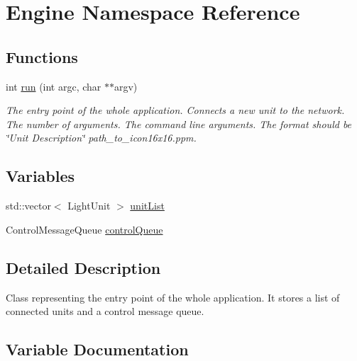 \hypertarget{namespaceEngine}{}\section{Engine Namespace Reference}
\label{namespaceEngine}
\subsection*{Functions}
\begin{DoxyCompactItemize}
\item 
int \hyperlink{namespaceEngine_a18825e7d28c8436bb36f3ca02b99d41f}{run} (int argc, char $\ast$$\ast$argv)\hypertarget{namespaceEngine_a18825e7d28c8436bb36f3ca02b99d41f}{}\label{namespaceEngine_a18825e7d28c8436bb36f3ca02b99d41f}

\begin{DoxyCompactList}\small\item\em The entry point of the whole application. Connects a new unit to the network.  The number of arguments.  The command line arguments. The format should be \textquotesingle{}\char`\"{}\+Unit Description\char`\"{} path\+\_\+to\+\_\+icon16x16.\+ppm\textquotesingle{}. \end{DoxyCompactList}\end{DoxyCompactItemize}
\subsection*{Variables}
\begin{DoxyCompactItemize}
\item 
std\+::vector$<$ Light\+Unit $>$ \hyperlink{namespaceEngine_af251daeaa5143c5915b7726e6eb6a72d}{unit\+List}
\item 
Control\+Message\+Queue \hyperlink{namespaceEngine_a300dfed93e6ea0213f64e184373517ed}{control\+Queue}
\end{DoxyCompactItemize}


\subsection{Detailed Description}
Class representing the entry point of the whole application. It stores a list of connected units and a control message queue. 

\subsection{Variable Documentation}
